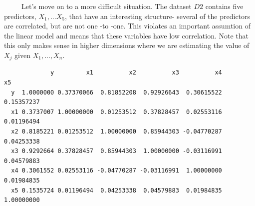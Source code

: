 \documentclass[12pt,twoside]{reedthesis}
\begin{document}
  ~~~~~Let's move on to a more difficult situation. The dataset \(D2\)
  contains five predictors, \(X_1,...X_5\), that have an interesting
  structure- several of the predictors are correlated, but are not one -to
  -one. This violates an important assumtion of the linear model and means
  that these variables have low correlation. Note that this only makes
  sense in higher dimensions where we are estimating the value of \(X_j\)
  given \(X_1,...,X_n\).
  
  \begin{Shaded}
  \begin{Highlighting}[]
  \StringTok{ }\NormalTok{(}\NormalTok{)}
  
  \StringTok{ }\NormalTok{*}\NormalTok{(}\StringTok{ }\NormalTok{(}\NormalTok{)}
  
  \StringTok{ }\StringTok{ }\StringTok{ }\NormalTok{(}\NormalTok{)}
  
  \StringTok{ }\NormalTok{(}\NormalTok{)}
  
  \StringTok{ }\NormalTok{*}\NormalTok{(}\StringTok{ }\NormalTok{(}\NormalTok{)}
  
  \StringTok{ }\StringTok{ }\StringTok{ } \NormalTok{*}\StringTok{ }\StringTok{ }\StringTok{ }\StringTok{ }\NormalTok{(}\NormalTok{)}
  
  \StringTok{ }
  
  \end{Highlighting}
  \end{Shaded}
  
  \begin{verbatim}
             y         x1          x2          x3          x4         x5
  y  1.0000000 0.37370066  0.81852208  0.92926643  0.30615522 0.15357237
  x1 0.3737007 1.00000000  0.01253512  0.37828457  0.02553116 0.01196494
  x2 0.8185221 0.01253512  1.00000000  0.85944303 -0.04770287 0.04253338
  x3 0.9292664 0.37828457  0.85944303  1.00000000 -0.03116991 0.04579883
  x4 0.3061552 0.02553116 -0.04770287 -0.03116991  1.00000000 0.01984835
  x5 0.1535724 0.01196494  0.04253338  0.04579883  0.01984835 1.00000000
  \end{verbatim}
  
\end{document}
